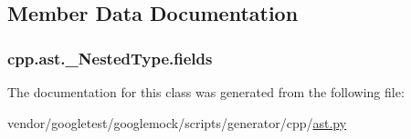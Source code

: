 \subsection{Member Data Documentation}
\subsubsection[{\texorpdfstring{fields}{fields}}]{\setlength{\rightskip}{0pt plus 5cm}cpp.\+ast.\+\_\+\+Nested\+Type.\+fields}\hypertarget{classcpp_1_1ast_1_1__NestedType_aed69c37a409b4d26e6cfde2de3185d86}{}\label{classcpp_1_1ast_1_1__NestedType_aed69c37a409b4d26e6cfde2de3185d86}


The documentation for this class was generated from the following file\+:\begin{DoxyCompactItemize}
\item 
vendor/googletest/googlemock/scripts/generator/cpp/\hyperlink{ast_8py}{ast.\+py}\end{DoxyCompactItemize}
